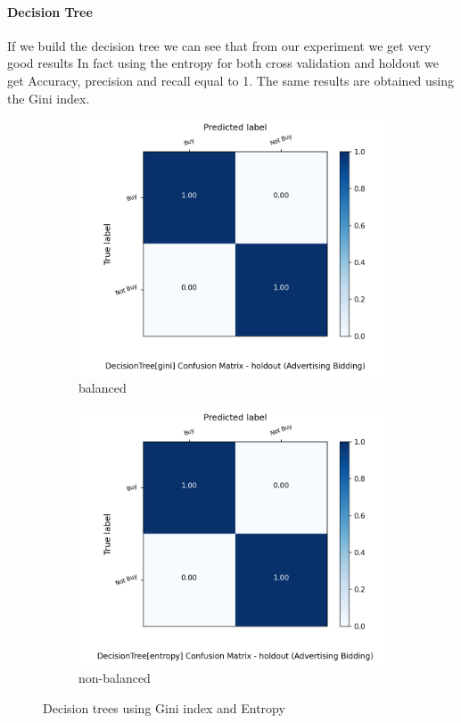 \documentclass{article}
\begin{document}
\paragraph{Decision Tree}
If we build the decision tree we can see that from our experiment we get very good results
In fact using the entropy for both cross validation and holdout we get Accuracy, precision and recall equal to 1.
The same results are obtained using the Gini index.


\begin{figure}[H]
	\centering
	\begin{subfigure}{.5\textwidth}
		\centering
		\includegraphics[width=1.1\textwidth]{Plots/advertisingBidding_DecisionTree_gini_balance_True_holdout.png}
		\caption{balanced}
	\end{subfigure}%
	\begin{subfigure}{.5\textwidth}
		\centering
		\includegraphics[width=1.1\textwidth]{Plots/advertisingBidding_DecisionTree_entropy_balance_True_holdout.png}
		\caption{non-balanced}
	\end{subfigure}
	\caption{{\color{red} Decision trees using Gini index and Entropy}}
\end{figure}
\end{document}
